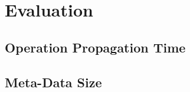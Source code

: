 \chapter{Evaluation}
\label{cha:evaluation}

\section{Operation Propagation Time}
\label{sec:operation_propagation_time}

\section{Meta-Data Size}
\label{sec:meta-data_size}